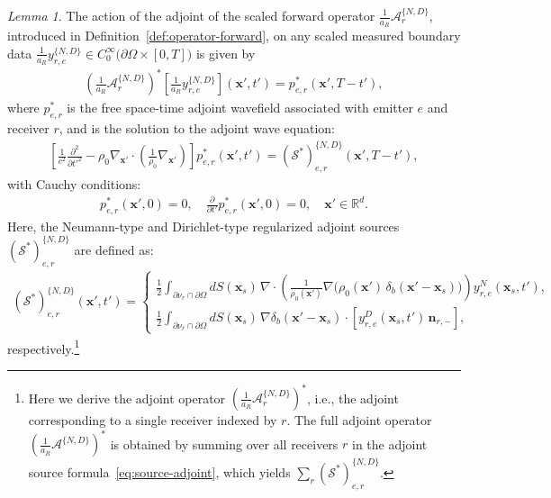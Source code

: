 \documentclass[11pt,reqno]{amsart}
\theoremstyle{remark}
\theoremstyle{italic_lemma}
\newtheorem{lemma}{Lemma}
\newcommand{\bx}{\boldsymbol{x}}
\newcommand{\bn}{\boldsymbol{n}}
\begin{document}
\begin{lemma}   \label{lemma-adjoint-operator}
The action of the adjoint of the scaled forward operator \(\frac{1}{a_R} \mathcal{A}_r^{\{ N,D\}} \), introduced in Definition~\ref{def:operator-forward}, on any scaled measured boundary data \(  \frac{1}{a_R} y_{r,e}^{ \{N,D\} } \in  C_0^{\infty} \big(\partial \Omega \times [0, T] \big) \) is given by
\begin{align}  \label{eq:adjoint-op}
    \left( \frac{1}{a_R} \mathcal{A}_r^{\{ N,D\}} \right)^*  \left[   \frac{1}{a_R} y_{r,e}^{\{N,D\}}  \right](\bx', t') = p_{e,r}^*(\bx', T - t'),
\end{align}
where \( p_{e,r}^* \) is the free space-time adjoint wavefield associated with emitter \(e\) and receiver \(r\), and is the solution to the adjoint wave equation:
\begin{align}  \label{eq:wave-adjoint}
    \left[ \frac{1}{c^2} \frac{\partial^2 }{\partial t'^2} - \rho_0  \nabla_{\bx'} \cdot \left( \frac{1}{\rho_0} \nabla_{\bx'} \right) \right] p_{e,r}^*(\bx',t') = \left( \mathcal{S}^*\right)_{e,r}^{\{N,D\}} (\bx', T - t'),
\end{align}
with Cauchy conditions:
\begin{align}   \label{eq:adjoint-initial}
    p_{e,r}^*(\bx', 0) = 0, \quad \frac{\partial}{\partial t'} p_{e,r}^*(\bx', 0) = 0, \quad  \bx' \in \mathbb{R}^d.
\end{align}
\noindent
Here, the Neumann-type and Dirichlet-type regularized adjoint sources \( \left( \mathcal{S}^* \right)_{e,r}^{\{N,D\}} \) are defined as:
\begin{align}  \label{eq:source-adjoint}
    \left( \mathcal{S}^* \right)_{e,r}^{\{N,D\}} (\bx', t') = 
    \begin{cases}
         \displaystyle \frac{1}{2} \int_{\partial \nu_r \cap \partial \Omega} dS(\bx_s) \, \nabla \cdot \left( \frac{1}{\rho_0(\bx')} \nabla \Big( \rho_0(\bx') \, \delta_b(\bx' - \bx_s) \Big) \right) y_{r,e}^N(\bx_s, t'), \\[2ex]
        \displaystyle \frac{1}{2} \int_{\partial \nu_r \cap \partial \Omega} dS(\bx_s) \, \nabla \delta_b(\bx' - \bx_s) \cdot \left[ y_{r,e}^D(\bx_s, t') \, \bn_{r,-} \right],
    \end{cases}
\end{align}
respectively.\footnote{Here we derive the adjoint operator $\left( \frac{1}{a_R}\mathcal{A}_{r}^{\{N,D\}} \right)^*$, i.e., the adjoint corresponding to a single receiver indexed by $r$. The full adjoint operator $\left( \frac{1}{a_R}\mathcal{A}^{\{N,D\}} \right)^*$ is obtained by summing over all receivers $r$ in the adjoint source formula~\eqref{eq:source-adjoint}, which yields $\sum_{r} \left(\mathcal{S}^{*}\right)_{e,r}^{\{N,D\}}$.}

\end{lemma}
\end{document}
